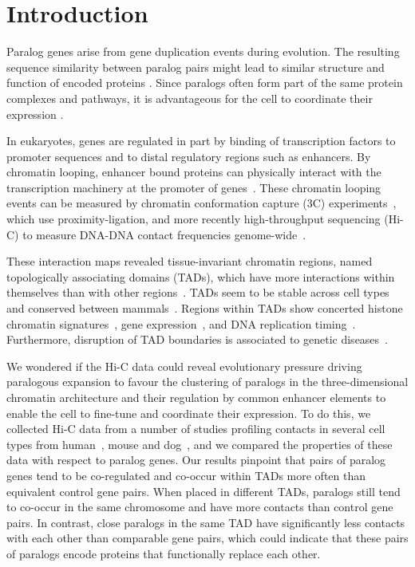 \documentclass[a4paper,twoside=true,openright,parskip=full,chapterprefix=true,11pt,headings=normal,bibliography=totoc,listof=totoc,titlepage=on,captions=tableabove,draft=false]{scrreprt}
\theoremstyle{definition}
\theoremstyle{definition}
\theoremstyle{definition}
\theoremstyle{remark}
\begin{document}
\hypertarget{introduction}{%
\section{Introduction}\label{introduction}}

Paralog genes arise from gene duplication events during evolution. The
resulting sequence similarity between paralog pairs might lead to
similar structure and function of encoded proteins \citep{Koonin2005}.
Since paralogs often form part of the same protein complexes and
pathways, it is advantageous for the cell to coordinate their expression
\citep{Makova2003}.

In eukaryotes, genes are regulated in part by binding of transcription
factors to promoter sequences and to distal regulatory regions such as
enhancers. By chromatin looping, enhancer bound proteins can physically
interact with the transcription machinery at the promoter of
genes~\citep{Ptashne1986, Deng2012, Carter2002, Tolhuis2002, Spitz2012}.
These chromatin looping events can be measured by chromatin conformation
capture (3C) experiments~\citep{Dekker2002}, which use
proximity-ligation, and more recently high-throughput sequencing (Hi-C)
to measure DNA-DNA contact frequencies
genome-wide~\citep{Lieberman-Aiden2009}.

These interaction maps revealed tissue-invariant chromatin regions,
named topologically associating domains (TADs), which have more
interactions within themselves than with other
regions~\citep{Dixon2012, Nora2012, Sexton2012}. TADs seem to be stable
across cell types and conserved between
mammals~\citep{Dixon2012, Rao2014, VietriRudan2015}. Regions within TADs
show concerted histone chromatin
signatures~\citep{Dixon2012, Sexton2012}, gene
expression~\citep{LeDily2014, Nora2012}, and DNA replication
timing~\citep{Pope2014}. Furthermore, disruption of TAD boundaries is
associated to genetic diseases~\citep{Ibn-Salem2014, Lupianez2015}.

We wondered if the Hi-C data could reveal evolutionary pressure driving
paralogous expansion to favour the clustering of paralogs in the
three-dimensional chromatin architecture and their regulation by common
enhancer elements to enable the cell to fine-tune and coordinate their
expression. To do this, we collected Hi-C data from a number of studies
profiling contacts in several cell types from
human~\citep{Dixon2012, Rao2014}, mouse and dog~\citep{VietriRudan2015},
and we compared the properties of these data with respect to paralog
genes. Our results pinpoint that pairs of paralog genes tend to be
co-regulated and co-occur within TADs more often than equivalent control
gene pairs. When placed in different TADs, paralogs still tend to
co-occur in the same chromosome and have more contacts than control gene
pairs. In contrast, close paralogs in the same TAD have significantly
less contacts with each other than comparable gene pairs, which could
indicate that these pairs of paralogs encode proteins that functionally
replace each other.
\end{document}
